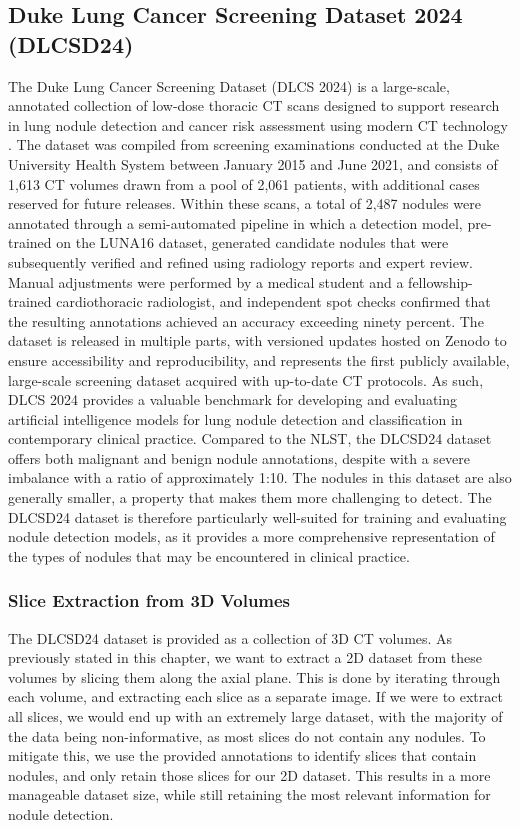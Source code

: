 \subsection{Duke Lung Cancer Screening Dataset 2024 (DLCSD24)}
The Duke Lung Cancer Screening Dataset (DLCS 2024) is a large-scale, annotated collection of low-dose thoracic CT scans designed to support research in lung nodule detection and cancer risk assessment using modern CT technology \cite{dlcsd24}. The dataset was compiled from screening examinations conducted at the Duke University Health System between January 2015 and June 2021, and consists of 1,613 CT volumes drawn from a pool of 2,061 patients, with additional cases reserved for future releases. Within these scans, a total of 2,487 nodules were annotated through a semi-automated pipeline in which a detection model, pre-trained on the LUNA16 dataset, generated candidate nodules that were subsequently verified and refined using radiology reports and expert review. Manual adjustments were performed by a medical student and a fellowship-trained cardiothoracic radiologist, and independent spot checks confirmed that the resulting annotations achieved an accuracy exceeding ninety percent. The dataset is released in multiple parts, with versioned updates hosted on Zenodo to ensure accessibility and reproducibility, and represents the first publicly available, large-scale screening dataset acquired with up-to-date CT protocols. As such, DLCS 2024 provides a valuable benchmark for developing and evaluating artificial intelligence models for lung nodule detection and classification in contemporary clinical practice.
Compared to the NLST, the DLCSD24 dataset offers both malignant and benign nodule annotations, despite with a severe imbalance with a ratio of approximately 1:10. The nodules in this dataset are also generally smaller, a property that makes them more challenging to detect. The DLCSD24 dataset is therefore particularly well-suited for training and evaluating nodule detection models, as it provides a more comprehensive representation of the types of nodules that may be encountered in clinical practice.

\subsubsection{Slice Extraction from 3D Volumes}
The DLCSD24 dataset is provided as a collection of 3D CT volumes. As previously stated in this chapter, we want to extract a 2D dataset from these volumes by slicing them along the axial plane. This is done by iterating through each volume, and extracting each slice as a separate image. If we were to extract all slices, we would end up with an extremely large dataset, with the majority of the data being non-informative, as most slices do not contain any nodules. To mitigate this, we use the provided annotations to identify slices that contain nodules, and only retain those slices for our 2D dataset. This results in a more manageable dataset size, while still retaining the most relevant information for nodule detection. 


